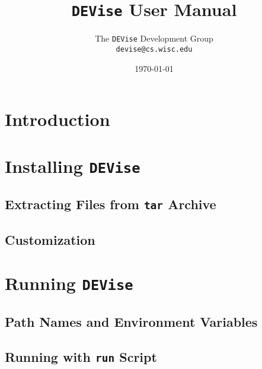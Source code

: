 
\def\Devise{{\tt DEVise} }
\def\filename#1{{\tt #1}}
\def\code#1{{\tt #1}}
\def\menu#1{{\tt #1}}
\def\term#1{#1}
\def\variable#1{{\tt #1}}

\def\scaleepspic[#1]#2#3{
\begin{figure}[htb]
\centering\leavevmode\epsfxsize=#1\epsfbox{#2}
\caption{#3}
\end{figure}
}

\def\fullepspic#1#2{
\begin{figure}[htb]
\centering\leavevmode\epsfxsize=\textwidth\epsfbox{#1}
\caption{#2}
\end{figure}
}


\title{\Devise User Manual}
\author{The \Devise Development Group \\
\code{devise@cs.wisc.edu}
}
\date{\today}

\maketitle

\section{Introduction}

\section{Installing \Devise}

\subsection{Extracting Files from \code{tar} Archive}

\subsection{Customization}

\section{Running \Devise}

\subsection{Path Names and Environment Variables}

\subsection{Running with \code{run} Script}

